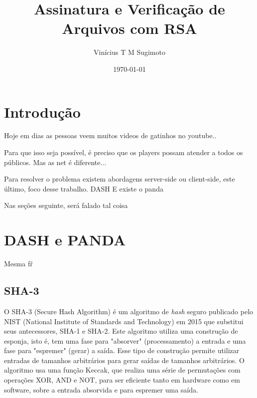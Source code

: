 \documentclass{article}
\title{Assinatura e Verificação de Arquivos com RSA}
\author{Vinícius T M Sugimoto}
\date{\today}
\begin{document}
\maketitle

\section{Introdução} %
\label{section:introducao}






Hoje em dias as pessoas veem muitos videos de gatinhos no youtube..

Para que isso seja possível, é preciso que os players possam atender a todos os públicos.
Mas as net é diferente...

Para resolver o problema existem abordagens server-side ou client-side, este último, foco desse trabalho.
DASH
E existe o panda

Nas seções seguinte, será falado tal coisa


\section{DASH e PANDA}
Mesma fŕ

\subsection{SHA-3}
\label{subsection:sha3}
O SHA-3 (Secure Hash Algorithm) é um algoritmo de \textit{hash} seguro publicado pelo NIST (National
Institute of Standards and Technology) em 2015 que substitui seus antecessores, SHA-1 e SHA-2. Este
algoritmo utiliza uma construção de esponja, isto é, tem uma fase para "absorver" (processamento) a
entrada e uma fase para "espremer" (gerar) a saída. Esse tipo de construção permite utilizar entradas
de tamanhos arbitrários para gerar saídas de tamanhos arbitrários. O algoritmo usa uma função Keccak,
que realiza uma série de permutações com operações XOR, AND e NOT, para ser eficiente tanto em hardware
como em software, sobre a entrada absorvida e para espremer uma saída.
\end{document}

